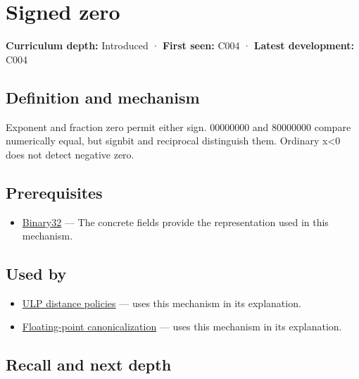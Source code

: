 \hypertarget{appendix-3a048f032c1f}{}\label{referencestart:appendix-3a048f032c1f}
\section{Signed zero}\label{appendix-3a048f032c1f-signed-zero}

\textbf{Curriculum depth:} Introduced · \textbf{First seen:} C004 · \textbf{Latest development:} C004

\begin{allmightroledefinition}

\subsection{Definition and mechanism}\label{appendix-3a048f032c1f-definition-and-mechanism}

Exponent and fraction zero permit either sign. 00000000 and 80000000 compare numerically equal, but signbit and reciprocal distinguish them. Ordinary x\textless0 does not detect negative zero.

\end{allmightroledefinition}

\subsection{Prerequisites}\label{appendix-3a048f032c1f-prerequisites}

\begin{itemize}
\tightlist
\item
  \hyperref[appendix-5057f9ad327f]{Binary32} --- The concrete fields provide the representation used in this mechanism.
\end{itemize}

\subsection{Used by}\label{appendix-3a048f032c1f-used-by}

\begin{itemize}
\tightlist
\item
  \hyperref[appendix-deca299ae4b8]{ULP distance policies} --- uses this mechanism in its explanation.
\item
  \hyperref[appendix-e90053a4b201]{Floating-point canonicalization} --- uses this mechanism in its explanation.
\end{itemize}

\subsection{Recall and next depth}\label{appendix-3a048f032c1f-recall-and-next-depth}


